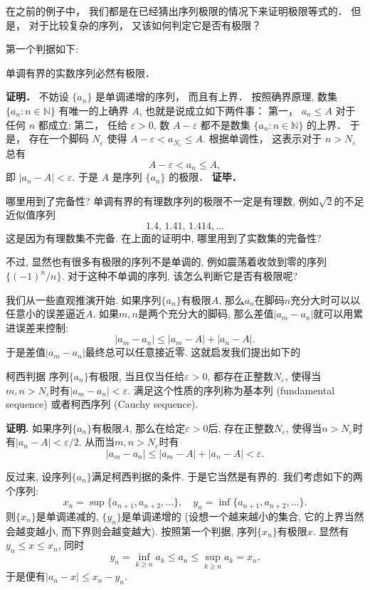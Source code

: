 

在之前的例子中， 我们都是在已经猜出序列极限的情况下来证明极限等式的． 但是， 对于比较复杂的序列， 又该如何判定它是否有极限？

第一个判据如下:

\begin{theorem}{}
单调有界的实数序列必然有极限．
\end{theorem}
\textbf{证明．} 不妨设 $\{a_n\}$ 是单调递增的序列， 而且有上界． 按照确界原理, 数集 $\{a_n:n\in\mathbb{N}\}$ 有唯一的上确界 $A$, 也就是说成立如下两件事： 第一， $a_n\leq A$ 对于任何 $n$ 都成立; 第二， 任给 $\varepsilon>0$, 数 $A-\varepsilon$ 都不是数集 $\{a_n:n\in\mathbb{N}\}$ 的上界． 于是， 存在一个脚码 $N_\varepsilon$ 使得 $A-\varepsilon<a_{N_\varepsilon}\leq A$. 根据单调性， 这表示对于 $n>N_\varepsilon$ 总有
\[A-\varepsilon<a_n\leq A,\]
即 $|a_n-A|<\varepsilon$. 于是 $A$ 是序列 $\{a_n\}$ 的极限． \textbf{证毕．}

\begin{exercise}{哪里用到了完备性?}
单调有界的有理数序列的极限不一定是有理数, 例如$\sqrt{2}$的不足近似值序列
$$
1.4,\,1.41,\,1.414,...
$$
这是因为有理数集不完备. 在上面的证明中, 哪里用到了实数集的完备性?
\end{exercise}

不过, 显然也有很多有极限的序列不是单调的, 例如震荡着收敛到零的序列$\{(-1)^n/n\}$. 对于这种不单调的序列, 该怎么判断它是否有极限呢?

我们从一些直观推演开始. 如果序列$\{a_n\}$有极限$A$, 那么$a_n$在脚码$n$充分大时可以以任意小的误差逼近$A$. 如果$m,n$是两个充分大的脚码, 那么差值$|a_m-a_n|$就可以用累进误差来控制:
$$
|a_m-a_n|\leq |a_m-A|+|a_n-A|.
$$
于是差值$|a_m-a_n|$最终总可以任意接近零. 这就启发我们提出如下的

\begin{theorem}{柯西判据}
序列$\{a_n\}$有极限, 当且仅当任给$\varepsilon>0$, 都存在正整数$N_\varepsilon$, 使得当$m,n>N_\varepsilon$时有$|a_m-a_n|<\varepsilon$. 满足这个性质的序列称为基本列 (fundamental sequence) 或者柯西序列 (Cauchy sequence).
\end{theorem}

\textbf{证明.} 如果序列$\{a_n\}$有极限$A$, 那么在给定$\varepsilon>0$后, 存在正整数$N_\varepsilon$, 使得当$n>N_\varepsilon$时有$|a_n-A|<\varepsilon/2$. 从而当$m,n>N_\varepsilon$时有
$$
|a_m-a_n|\leq|a_m-A|+|a_n-A|<\varepsilon.
$$

反过来, 设序列$\{a_n\}$满足柯西判据的条件. 于是它当然是有界的. 我们考虑如下的两个序列:
$$
x_n=\sup\{a_{n+1},a_{n+2},...\},
\quad
y_n=\inf\{a_{n+1},a_{n+2},...\}.
$$
则$\{x_n\}$是单调递减的, $\{y_n\}$是单调递增的 (设想一个越来越小的集合, 它的上界当然会越变越小, 而下界则会越变越大). 按照第一个判据, 序列$\{x_n\}$有极限$x$. 显然有$y_n\leq x\leq x_n$, 同时
$$
y_n=\inf_{k\geq n}a_k\leq a_n\leq \sup_{k\geq n}a_k=x_n.
$$
于是便有$|a_n-x|\leq x_n-y_n$. 

